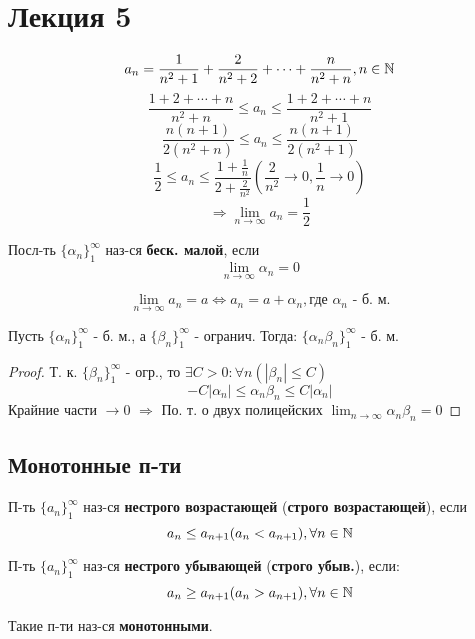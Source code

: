 \section{Лекция 5}

\begin{example}
\[
  a_n = \frac{1}{n^{2} + 1} + \frac{2}{n^{2} + 2} +\cdots + \frac{n}{n^{2} + n}, n \in \mathbb{N}
\] 
\[
  \frac{1 + 2 + \cdots + n}{n^{2} + n} \leq a_n \leq \frac{1 + 2 + \cdots + n}{n^{2} + 1}
\] 
\[
  \frac{n(n + 1)}{2(n^{2} + n)} \leq a_n \leq \frac{n(n + 1)}{2(n^{2} + 1)}
\] 
\[
  \frac{1}{2} \leq a_n \leq \frac{1 + \frac{1}{n}}{2 + \frac{2}{n^{2}}} (\frac{2}{n^{2}} \rightarrow 0, \frac{1}{n} \rightarrow 0)
\] 
\[
\Rightarrow \lim_{n\to\infty}a_n = \frac{1}{2}
\] 
\end{example}

\begin{definition}
Посл-ть $\{\alpha_n\}_{1}^{\infty}$ наз-ся \textbf{беск. малой}, если
\[
  \lim_{n\to\infty}\alpha_n = 0
\]
\end{definition}
\begin{note}
\[
\lim_{n\to\infty}a_n = a \iff a_n = a + \alpha_n, \text{где $\alpha_n$ - б. м.}
\]
\end{note}
\begin{example}
Пусть $\{\alpha_n\}_{1}^{\infty}$ - б. м., а $\{\beta_n\}_{1}^{\infty}$ - огранич. Тогда: $\{\alpha_n \beta_n\}_{1}^{\infty}$ - б. м.
\end{example}
\begin{proof}
Т. к. $\{\beta_n\}_{1}^{\infty}$ - огр., то $\exists C > 0 \colon \forall n (|\beta_n| \leq C)$
\[
-C |\alpha_n| \leq \alpha_n \beta_n \leq C |\alpha_n|
\] 
Крайние части $\rightarrow 0$ $\Rightarrow$ По. т. о двух полицейских $\lim_{n\to\infty} \alpha_n \beta_n = 0$
\end{proof}

\subsection{Монотонные п-ти}

\begin{definition}
П-ть $\{a_n\}_{1}^{\infty}$ наз-ся \textbf{нестрого возрастающей} (\textbf{строго возрастающей}), если \[
a_n \leq a_{n + 1} (a_n < a_{n + 1}), \forall n \in \mathbb{N}
\] 

П-ть $\{a_n\}_{1}^{\infty}$ наз-ся \textbf{нестрого убывающей} (\textbf{строго убыв.}), если:
\[
a_n \geq a_{n + 1} (a_n > a_{n + 1}), \forall n \in \mathbb{N}
\] 

Такие п-ти наз-ся \textbf{монотонными}.
\end{definition}


